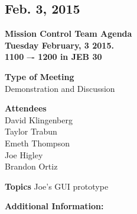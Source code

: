 \documentclass[pdftex,11pt]{article}
\begin{document}
\clearpage


\subsection{Feb. 3, 2015}
{ \huge \bfseries Mission Control Team Agenda \\[0.4cm] }
{ \huge \bfseries Tuesday February, 3 2015.\\1100 –-  1200  in JEB 30\\[0.4cm] }
\vspace*{2.5mm}

{ \large \bfseries \hspace*{2 mm} Type of Meeting\\}
\hspace*{12 mm} Demonstration and Discussion
\vspace*{1.5mm}

{ \large \bfseries \hspace*{2 mm} Attendees\\}
\hspace*{12mm} David Klingenberg\\
\hspace*{12mm} Taylor Trabun\\
\hspace*{12mm} Emeth Thompson\\
\hspace*{12mm} Joe Higley\\
\hspace*{12mm} Brandon Ortiz\\
\vspace*{1.5mm}

{ \large \bfseries \noindent Topics}
\hspace*{12mm} Joe's GUI prototype
\vspace*{2.5mm}

\vspace*{2.5mm}
{ \large \bfseries \noindent Additional Information:}
\end{document}
